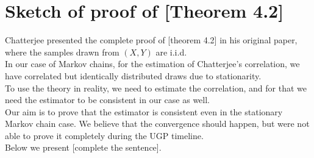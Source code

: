 \chapter{Sketch of proof of [Theorem 4.2]}
Chatterjee presented the complete proof of [theorem 4.2] in his original paper,
where the samples drawn from $(X, Y)$ are i.i.d. \\
In our case of Markov chains, for the estimation of Chatterjee's correlation,
we have correlated but identically distributed draws due to stationarity. \\
To use the theory in reality, we need to estimate the correlation, and for that we need the estimator to be consistent in our case as well.\\
Our aim is to prove that the estimator is consistent even in the stationary Markov chain case.
We believe that the convergence should happen, but were not able to prove it completely during the UGP timeline. \\
Below we present [complete the sentence].
